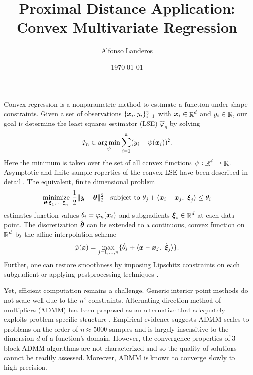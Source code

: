 \documentclass{article}
\title{Proximal Distance Application: Convex Multivariate Regression}
\author{Alfonso Landeros}
\date{\today}
\begin{document}
\maketitle

Convex regression is a nonparametric method to estimate a function under shape constraints.
Given a set of observations \(\{\boldsymbol{x}_{i}, y_{i}\}_{i=1}^{n}\) with \(\boldsymbol{x}_{i} \in \mathop{\mathbb{R}}\nolimits^{d}\) and \(y_{i} \in \mathop{\mathbb{R}}\nolimits\), our goal is determine the least squares estimator (LSE) \(\hat{\varphi}_{n}\) by solving
\begin{equation*}
    \hat{\varphi}_{n} \in \underset{\psi}{\arg \min}
    \sum_{i=1}^{n} (y_{i} - \psi(\boldsymbol{x}_{i}))^{2}.
\end{equation*}
Here the minimum is taken over the set of all convex functions \(\psi : \mathop{\mathbb{R}}\nolimits^{d} \rightarrow \mathop{\mathbb{R}}\nolimits\).
Asymptotic and finite sample roperties of the convex LSE have been described in detail \cite{seijo2011}.
The equivalent, finite dimensional problem
\begin{equation}
    \label{eq:problem_statement}
    \underset{\boldsymbol{\theta}; \boldsymbol{\xi}_{1}, \ldots, \boldsymbol{\xi}_{n}}{\mathrm{minimize}}
    ~\frac{1}{2} \|\boldsymbol{y} - \boldsymbol{\theta}\|_{2}^{2}
    \quad
    \text{subject to}
    ~\theta_{j} + \langle{\boldsymbol{x}_{i} - \boldsymbol{x}_{j},~\boldsymbol{\xi}_{j}}\rangle \le \theta_{i}
\end{equation}
estimates function values \(\theta_{i} = \varphi_{n}(\boldsymbol{x}_{i})\) and subgradients \(\boldsymbol{\xi}_{i} \in \mathop{\mathbb{R}}\nolimits^{d}\) at each data point.
The discretization \(\hat{\boldsymbol{\theta}}\) can be extended to a continuous, convex function on \(\mathop{\mathbb{R}}\nolimits^{d}\) by the affine interpolation scheme
\begin{equation*}
    \hat{\varphi}(\boldsymbol{x})
    =
    \max_{j=1,\ldots,n}\{\hat{\theta}_{j}
    + \langle{\boldsymbol{x}- \boldsymbol{x}_{j},~\hat{\boldsymbol{\xi}}_{j}}\rangle\}.
\end{equation*}
Further, one can restore smoothness by imposing Lipschitz constraints on each subgradient or applying postprocessing techniques \cite{mazumder2018}.

Yet, efficient computation remains a challenge.
Generic interior point methods do not scale well due to the \(n^{2}\) constraints.
Alternating direction method of multipliers (ADMM) has been proposed as an alternative that adequately exploits problem-specific structure \cite{mazumder2018}.
Empirical evidence suggests ADMM scales to problems on the order of \(n \approx 5000\) samples and is largely insensitive to the dimension \(d\) of a function's domain.
However, the convergence properties of 3-block ADMM algorithms are not characterized and so the quality of solutions cannot be readily assessed.
Moreover, ADMM is known to converge slowly to high precision.
\end{document}
